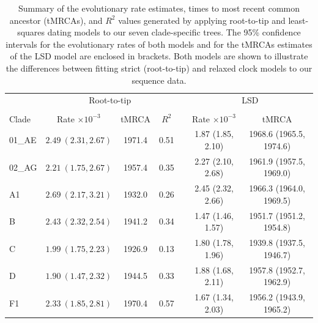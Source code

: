 \documentclass[12pt]{article}
\begin{document}
\begin{table}[htbp]
	\centering
	\begin{tabular}{lcccccc}
  	\hline
     & \multicolumn{3}{c}{Root-to-tip} && \multicolumn{2}{c}{LSD}\\
     \cline{1-4}\cline{6-7}\\
 	 Clade & Rate $\times 10^{-3}$ & tMRCA & $R^2$ & &Rate $\times 10^{-3}$ & tMRCA\\ 
 	 \cline{1-4}\cline{6-7}
	 01\_AE & $2.49~ (2.31, 2.67)$ & 1971.4 & 0.51 && 1.87 (1.85, 2.10) & 1968.6 (1965.5, 1974.6)\\ 
 	 02\_AG & $2.21~ (1.75, 2.67)$ & 1957.4 & 0.35 & &2.27 (2.10, 2.68) & 1961.9 (1957.5, 1969.0)\\ 
	A1 & $2.69~ (2.17, 3.21)$ & 1932.0 & 0.26 && 2.45 (2.32, 2.66) & 1966.3 (1964.0, 1969.5)\\ 
  	B & $2.43~ (2.32, 2.54)$ & 1941.2 & 0.34 & &1.47 (1.46, 1.57) & 1951.7 (1951.2, 1954.8)\\ 
  	C & $1.99~ (1.75, 2.23)$ & 1926.9 & 0.13 & &1.80 (1.78, 1.96) & 1939.8 (1937.5, 1946.7) \\ 
    D & $1.90~ (1.47, 2.32)$ & 1944.5 & 0.33 & &1.88 (1.68, 2.11)& 1957.8 (1952.7, 1962.9)\\ 
  	F1 & $2.33~ (1.85, 2.81)$ & 1970.4 & 0.57 & &1.67 (1.34, 2.03) & 1956.2 (1943.9, 1965.2)\\ 
   	\hline
	\end{tabular}
    \caption{Summary of the evolutionary rate estimates, times to most recent common ancestor (tMRCAs), and $R^2$ values generated by applying root-to-tip and least-squares dating models to our seven clade-specific trees. 
    The 95\% confidence intervals for the evolutionary rates of both models and for the tMRCAs estimates of the LSD model are enclosed in brackets.
    Both models are shown to illustrate the differences between fitting strict (root-to-tip) and relaxed clock models to our sequence data. 
    }
    \label{tab:xint}
\end{table}
\end{document}
